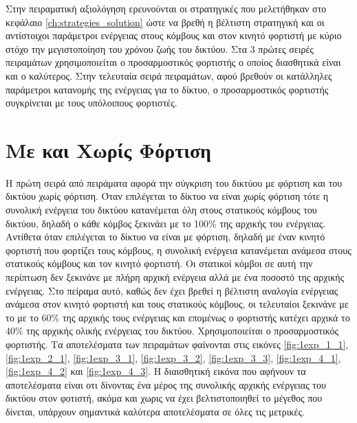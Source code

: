 Στην πειραματική αξιολόγηση ερευνούνται οι στρατηγικές που μελετήθηκαν στο κεφάλαιο \ref{ch:strategies_solution} ώστε να βρεθή η βέλτιστη στρατηγική και οι
αντίστοιχοι παράμετροι ενέργειας στους κόμβους και στον κινητό φορτιστή με κύριο στόχο την μεγιστοποίηση του χρόνου ζωής του δικτύου. Στα 3 πρώτες σειρές πειραμάτων
χρησιμοποιείται ο προσαρμοστικός φορτιστής ο οποίος διασθητικά είναι και ο καλύτερος. Στην τελευταία σειρά πειραμάτων, αφού βρεθούν οι κατάλληλες παράμετροι
κατανομής της ενέργειας για το δίκτυο, ο προσαρμοστικός φορτιστής συγκρίνεται με τους υπόλοιπους φορτιστές.

\section{Με και Χωρίς Φόρτιση}\label{sc:result1}
Η πρώτη σειρά από πειράματα αφορά την σύγκριση του δικτύου με φόρτιση και του δικτύου χωρίς φόρτιση. Όταν επιλέγεται το δίκτυο να είναι χωρίς φόρτιση τότε η συνολική
ενέργεια του δικτύου κατανέμεται όλη στους στατικούς κόμβους του δικτύου, δηλαδή ο κάθε κόμβος ξεκινάει με το 100\% της αρχικής του ενέργειας. Αντίθετα όταν
επιλέγεται το δίκτυο να είναι με φόρτιση, δηλαδή με έναν κινητό φορτιστή που φορτίζει τους κόμβους, η συνολική ενέργεια κατανέμεται ανάμεσα στους στατικούς κόμβους
και τον κινητό φορτιστή. Οι στατικοί κόμβοι σε αυτή την περίπτωση δεν ξεκινάνε με πλήρη αρχική ενέργεια αλλά με ένα ποσοστό της αρχικής ενέργειας. Στο πείραμα αυτό,
καθώς δεν έχει βρεθεί η βέλτιστη αναλογία ενέργειας ανάμεσα στον κινητό φορτιστή και τους στατικούς κόμβους, οι τελευταίοι ξεκινάνε με το με το 60\% της αρχικής τους
ενέργειας και επομένως ο φορτιστής κατέχει αρχικά το 40\% της αρχικής ολικής ενέργειας του δικτύου. Χρησιμοποιείται ο προσαρμοστικός φορτιστής. Τα αποτελέσματα των
πειραμάτων φαίνονται στις εικόνες \ref{fig:1exp_1_1}, \ref{fig:1exp_2_1}, \ref{fig:1exp_3_1}, \ref{fig:1exp_3_2}, \ref{fig:1exp_3_3}, \ref{fig:1exp_4_1},
\ref{fig:1exp_4_2} και \ref{fig:1exp_4_3}. Η διαισθητική εικόνα που αφήνουν τα αποτελέσματα είναι οτι δίνοντας ένα μέρος της συνολικής αρχικής ενέργειας του δικτύου
στον φοτιστή, ακόμα και χωρις να έχει βελτιστοποιηθεί το μέγεθος που δίνεται, υπάρχουν σημαντικά καλύτερα αποτελέσματα σε όλες τις μετρικές.



